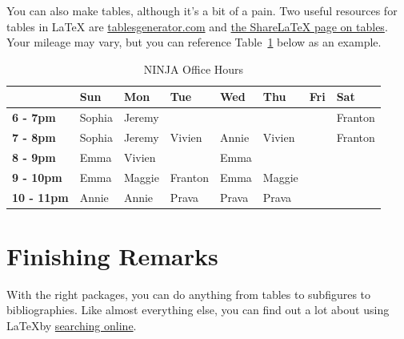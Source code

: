 \documentclass[11pt]{article}
\begin{document}
You can also make tables, although it's a bit of a pain. Two useful resources for tables in \LaTeX{} are \href{http://www.tablesgenerator.com/latex_tables}{tablesgenerator.com} and \href{https://www.sharelatex.com/learn/Tables}{the Share\LaTeX{} page on tables}. Your mileage may vary, but you can reference Table~\ref{tab:ninjahours} below as an example.

\begin{table}[!ht]

\small                      %
\centering                  %
\caption{NINJA Office Hours} %
\label{tab:ninjahours}      %

\begin{tabular}{m{0.75in}|m{0.6in} m{0.6in} m{0.6in} m{0.6in} m{0.6in} m{0.6in} m{0.6in}}
&                   \textbf{Sun}&   \textbf{Mon}&   \textbf{Tue}&   \textbf{Wed}&   \textbf{Thu}&   \textbf{Fri}&   \textbf{Sat}\\ \hline
\textbf{6 - 7pm}&   Sophia&         Jeremy&         &               &               &               &               Franton\\
\textbf{7 - 8pm}&   Sophia&         Jeremy&         Vivien&         Annie&          Vivien&         &               Franton\\
\textbf{8 - 9pm}&   Emma&           Vivien&         &               Emma&           &               &               \\
\textbf{9 - 10pm}&  Emma&           Maggie&         Franton&        Emma&           Maggie&         &               \\
\textbf{10 - 11pm}& Annie&          Annie&          Prava&          Prava&          Prava&          &
\end{tabular}

\end{table}

\section{Finishing Remarks}
With the right packages, you can do anything from tables to subfigures to bibliographies. Like almost everything else, you can find out a lot about using \LaTeX by \href{http://lmgtfy.com/?q=how+to+LaTeX}{searching online}.
\end{document}
